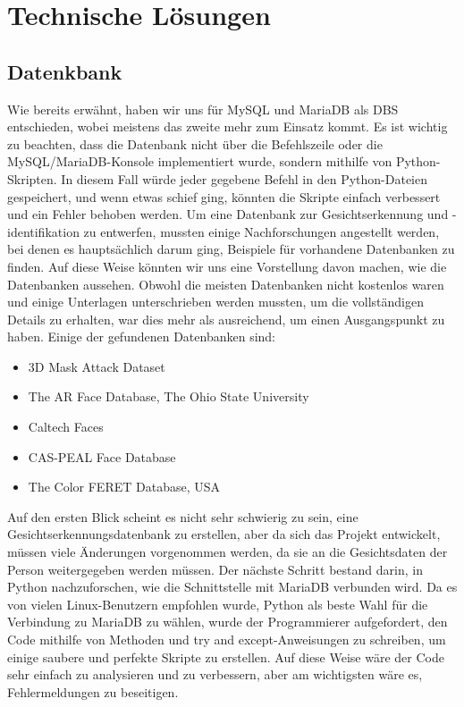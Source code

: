 \section{Technische Lösungen}
\subsection{Datenkbank}
Wie bereits erwähnt, haben wir uns für MySQL und MariaDB als DBS entschieden, wobei meistens das zweite mehr zum Einsatz kommt. Es ist wichtig zu beachten, dass die Datenbank nicht über die Befehlszeile oder die MySQL/MariaDB-Konsole implementiert wurde, sondern mithilfe von Python-Skripten. In diesem Fall würde jeder gegebene Befehl in den Python-Dateien gespeichert, und wenn etwas schief ging, könnten die Skripte einfach verbessert und ein Fehler behoben werden.
\bigbreak
Um eine Datenbank zur Gesichtserkennung und -identifikation zu entwerfen, mussten einige Nachforschungen angestellt werden, bei denen es hauptsächlich darum ging, Beispiele für vorhandene Datenbanken zu finden. Auf diese Weise könnten wir uns eine Vorstellung davon machen, wie die Datenbanken aussehen. Obwohl die meisten Datenbanken nicht kostenlos waren und einige Unterlagen unterschrieben werden mussten, um die vollständigen Details zu erhalten, war dies mehr als ausreichend, um einen Ausgangspunkt zu haben. Einige der gefundenen Datenbanken sind:
\begin{itemize}
	\item 3D Mask Attack Dataset
	\item The AR Face Database, The Ohio State University
	\item Caltech Faces
	\item CAS-PEAL Face Database
	\item The Color FERET Database, USA
\end{itemize}
Auf den ersten Blick scheint es nicht sehr schwierig zu sein, eine Gesichtserkennungsdatenbank zu erstellen, aber da sich das Projekt entwickelt, müssen viele Änderungen vorgenommen werden, da sie an die Gesichtsdaten der Person weitergegeben werden müssen.
\bigbreak
Der nächste Schritt bestand darin, in Python nachzuforschen, wie die Schnittstelle mit MariaDB verbunden wird. Da es von vielen Linux-Benutzern empfohlen wurde, Python als beste Wahl für die Verbindung zu MariaDB zu wählen, wurde der Programmierer aufgefordert, den Code mithilfe von Methoden und try and except-Anweisungen zu schreiben, um einige saubere und perfekte Skripte zu erstellen. Auf diese Weise wäre der Code sehr einfach zu analysieren und zu verbessern, aber am wichtigsten wäre es, Fehlermeldungen zu beseitigen.
